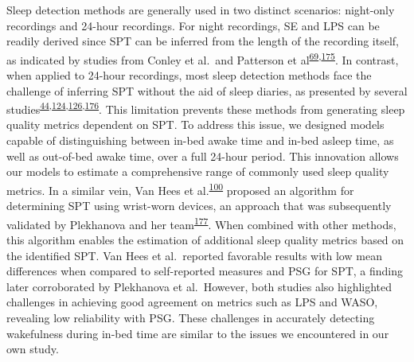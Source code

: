 \documentclass[
  10pt,
]{scrbook}
\begin{document}
Sleep detection methods are generally used in two distinct scenarios:
night-only recordings and 24-hour recordings. For night recordings, SE
and LPS can be readily derived since SPT can be inferred from the length
of the recording itself, as indicated by studies from Conley et al.~and
Patterson et
al\textsuperscript{\protect\hyperlink{ref-conley_agreement_2019}{69},\protect\hyperlink{ref-patterson_40_2023}{175}}.
In contrast, when applied to 24-hour recordings, most sleep detection
methods face the challenge of inferring SPT without the aid of sleep
diaries, as presented by several
studies\textsuperscript{\protect\hyperlink{ref-girschik_validation_2012}{44},\protect\hyperlink{ref-doherty_large_2017}{124},\protect\hyperlink{ref-anderson_assessment_2014}{126},\protect\hyperlink{ref-dozydave2023snooze}{176}}.
This limitation prevents these methods from generating sleep quality
metrics dependent on SPT. To address this issue, we designed models
capable of distinguishing between in-bed awake time and in-bed asleep
time, as well as out-of-bed awake time, over a full 24-hour period. This
innovation allows our models to estimate a comprehensive range of
commonly used sleep quality metrics. In a similar vein, Van Hees et
al.\textsuperscript{\protect\hyperlink{ref-van_hees_estimating_2018}{100}}
proposed an algorithm for determining SPT using wrist-worn devices, an
approach that was subsequently validated by Plekhanova and her
team\textsuperscript{\protect\hyperlink{ref-plekhanova_validation_2023}{177}}.
When combined with other methods, this algorithm enables the estimation
of additional sleep quality metrics based on the identified SPT. Van
Hees et al.~reported favorable results with low mean differences when
compared to self-reported measures and PSG for SPT, a finding later
corroborated by Plekhanova et al.~However, both studies also highlighted
challenges in achieving good agreement on metrics such as LPS and WASO,
revealing low reliability with PSG. These challenges in accurately
detecting wakefulness during in-bed time are similar to the issues we
encountered in our own study.
\end{document}
